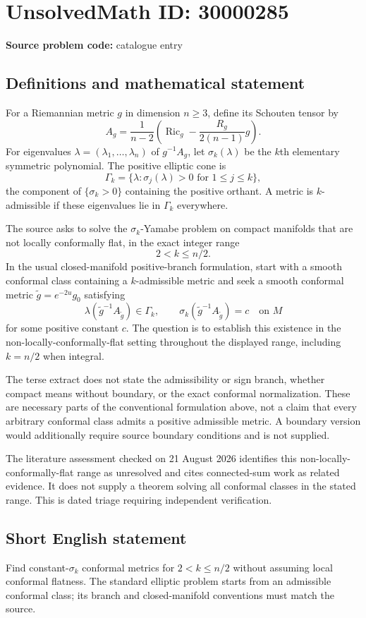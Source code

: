\documentclass[11pt]{article}
\begin{document}
\section*{UnsolvedMath ID: 30000285}
\textbf{Source problem code:} catalogue entry
\subsection{Definitions and mathematical statement}
For a Riemannian metric $g$ in dimension $n\ge3$, define its Schouten tensor by
\[
 A_g=\frac1{n-2}\left(\operatorname{Ric}_g-
                      \frac{R_g}{2(n-1)}g\right).
\]
For eigenvalues $\lambda=(\lambda_1,\ldots,\lambda_n)$ of $g^{-1}A_g$, let $\sigma_k(\lambda)$ be the $k$th elementary symmetric polynomial. The positive elliptic cone is
\[
 \Gamma_k=\{\lambda:\sigma_j(\lambda)>0\text{ for }1\le j\le k\},
\]
the component of $\{\sigma_k>0\}$ containing the positive orthant. A metric is $k$-admissible if these eigenvalues lie in $\Gamma_k$ everywhere.

The source asks to solve the $\sigma_k$-Yamabe problem on compact manifolds that are not locally conformally flat, in the exact integer range
\[
 2<k\le n/2.
\]
In the usual closed-manifold positive-branch formulation, start with a smooth conformal class containing a $k$-admissible metric and seek a smooth conformal metric $\widetilde g=e^{-2u}g_0$ satisfying
\[
 \lambda(\widetilde g^{-1}A_{\widetilde g})\in\Gamma_k,
 \qquad \sigma_k(\widetilde g^{-1}A_{\widetilde g})=c
 \quad\text{on }M
\]
for some positive constant $c$. The question is to establish this existence in the non-locally-conformally-flat setting throughout the displayed range, including $k=n/2$ when integral.

The terse extract does not state the admissibility or sign branch, whether compact means without boundary, or the exact conformal normalization. These are necessary parts of the conventional formulation above, not a claim that every arbitrary conformal class admits a positive admissible metric. A boundary version would additionally require source boundary conditions and is not supplied.

The literature assessment checked on 21 August 2026 identifies this non-locally-conformally-flat range as unresolved and cites connected-sum work as related evidence. It does not supply a theorem solving all conformal classes in the stated range. This is dated triage requiring independent verification.
\subsection{Short English statement}
Find constant-$\sigma_k$ conformal metrics for $2<k\le n/2$ without assuming local conformal flatness. The standard elliptic problem starts from an admissible conformal class; its branch and closed-manifold conventions must match the source.
\end{document}
